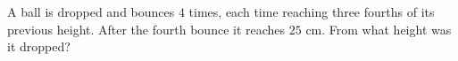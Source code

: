 A ball is dropped and bounces $4$ times, each time reaching three fourths of its previous height. After the fourth bounce it reaches $25$ cm. From what height was it dropped?

